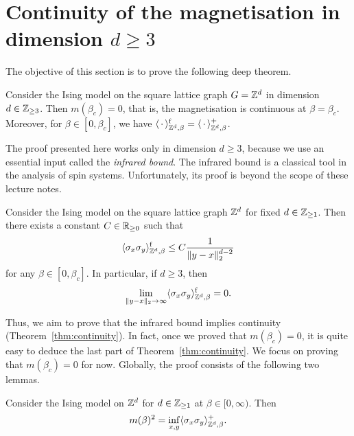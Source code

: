 \section{Continuity of the magnetisation in dimension $d\geq 3$}

The objective of this section is to prove the following deep theorem.

\begin{theorem}
    \label{thm:continuity}
    Consider the Ising model on the square lattice graph $G=\mathbb Z^d$
    in dimension $d\in\mathbb Z_{\geq 3}$.
    Then $m(\beta_c)=0$,
    that is, the magnetisation is continuous at $\beta=\beta_c$.
    Moreover, for $\beta\in[0,\beta_c]$,
    we have $\langle\,\cdot\,\rangle^{\operatorname{f}}_{\mathbb Z^d,\beta}=\langle\,\cdot\,\rangle^+_{\mathbb Z^d,\beta}$.
\end{theorem}

The proof presented here works only in dimension $d\geq 3$,
because we use an essential input called the \emph{infrared bound}.
The infrared bound is a classical tool in the analysis of spin systems.
Unfortunately, its proof is beyond the scope of these lecture notes.

\begin{theorem}
    Consider the Ising model on the square lattice graph $\mathbb Z^d$ for fixed $d\in\mathbb Z_{\geq 1}$.
    Then there exists a constant $C\in\mathbb R_{\geq 0}$ such that
    \[
        \langle\sigma_x\sigma_y\rangle_{\mathbb Z^d,\beta}^{\operatorname{f}}
        \leq C\frac1{\|y-x\|_2^{d-2}}
    \]
    for any $\beta\in[0,\beta_c]$.
    In particular, if $d\geq 3$,
    then
    \begin{equation}
        \label{eq:infrared_simple_decay}
        \lim_{\|y-x\|_2\to\infty}\langle\sigma_x\sigma_y\rangle_{\Z^d,\beta}^\f=0.
    \end{equation}    
\end{theorem}

Thus, we aim to prove that the infrared bound implies continuity (Theorem~\ref{thm:continuity}).
In fact, once we proved that $m(\beta_c)=0$,
it is quite easy to deduce the last part of Theorem~\ref{thm:continuity}.
We focus on proving that $m(\beta_c)=0$ for now.
Globally, the proof consists of the following two lemmas.

\begin{lemma}
    Consider the Ising model on $\mathbb Z^d$ for $d\in\mathbb Z_{\geq 1}$ at $\beta\in[0,\infty)$.
    Then
    \[
        m(\beta)^2=\inf_{x,y}\langle\sigma_x\sigma_y\rangle_{\mathbb Z^d,\beta}^+.
    \]
\end{lemma}

